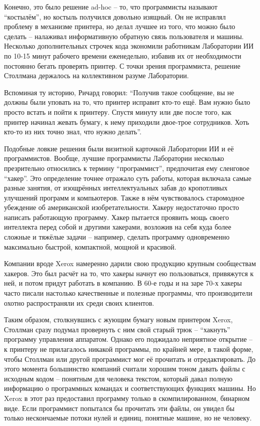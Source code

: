 Конечно, это было решение ad-hoc -- то, что программисты называют \enquote{костылём}, но костыль получился довольно изящный. Он не исправлял проблему в механизме принтера, но делал лучшее из того, что можно было сделать -- налаживал информативную обратную связь пользователя и машины. Несколько дополнительных строчек кода экономили работникам Лаборатории ИИ по 10-15 минут рабочего времени еженедельно, избавив их от необходимости постоянно бегать проверять принтер. С точки зрения программиста, решение Столлмана держалось на коллективном разуме Лаборатории.

Вспоминая ту историю, Ричард говорил: \enquote{Получив такое сообщение, вы не должны были уповать на то, что принтер исправит кто-то ещё. Вам нужно было просто встать и пойти к принтеру. Спустя минуту или две после того, как принтер начинал жевать бумагу, к нему приходили двое-трое сотрудников. Хоть кто-то из них точно знал, что нужно делать}.

Подобные ловкие решения были визитной карточкой Лаборатории ИИ и её программистов. Вообще, лучшие программисты Лаборатории несколько презрительно относились к термину \enquote{программист}, предпочитая ему сленговое \enquote{хакер}. Это определение точнее отражало суть работы, которая включала самые разные занятия, от изощрённых интеллектуальных забав до кропотливых улучшений программ и компьютеров. Также в нём чувствовалось старомодное убеждение об американской изобретательности. Хакеру недостаточно просто написать работающую программу. Хакер пытается проявить мощь своего интеллекта перед собой и другими хакерами, возложив на себя куда более сложные и тяжёлые задачи -- например, сделать программу одновременно максимально быстрой, компактной, мощной и красивой.

Компании вроде Xerox намеренно дарили свою продукцию крупным сообществам хакеров. Это был расчёт на то, что хакеры начнут ею пользоваться, привяжутся к ней, и потом придут работать в компанию. В 60-е годы и на заре 70-х хакеры часто писали настолько качественные и полезные программы, что производители охотно распространяли их среди своих клиентов.

Таким образом, столкнувшись с жующим бумагу новым принтером Xerox, Столлман сразу подумал провернуть с ним свой старый трюк -- \enquote{хакнуть} программу управления аппаратом. Однако его поджидало неприятное открытие -- к принтеру не прилагалось никакой программы, по крайней мере, в такой форме, чтобы Столлман или другой программист мог её прочитать и отредактировать. До этого момента большинство компаний считали хорошим тоном давать файлы с исходным кодом -- понятным для человека текстом, который давал полную информацию о программных командах и соответствующих функциях машины. Но Xerox в этот раз предоставил программу только в скомпилированном, бинарном виде. Если программист попытался бы прочитать эти файлы, он увидел бы только нескончаемые потоки нулей и единиц, понятные машине, но не человеку.

